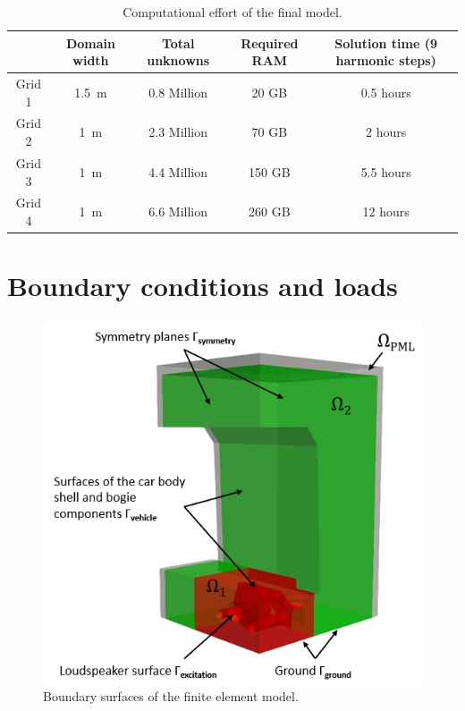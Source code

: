 {\begin{table}[H]
	\centering
	\caption{Computational effort of the final model.}
	\label{tab:computational_effort}
	\begin{tabular}{ccccc}
		\toprule
		& Domain width & Total unknowns & Required RAM & Solution time (9 harmonic steps) \\
		\midrule
		Grid 1 & \SI{1.5}{\meter} & 0.8 Million & 20 GB & 0.5 hours \\
		Grid 2 & \SI{1}{\meter} & 2.3 Million & 70 GB & 2 hours \\
		Grid 3 & \SI{1}{\meter} & 4.4 Million & 150 GB & 5.5 hours \\
		Grid 4 & \SI{1}{\meter} & 6.6 Million & 260 GB & 12 hours \\
		\bottomrule
	\end{tabular}
\end{table}



\newpage
\section{Boundary conditions and loads}
\label{section:boundary_conditions}

\begin{figure}
	\centering
	\includegraphics{fig/chap4/region_labels.png}
	\caption{Boundary surfaces of the finite element model.}
	\label{fig:boundary_conditions}
\end{figure}

}
